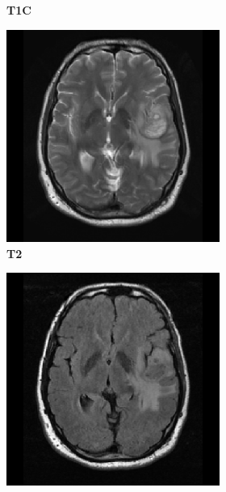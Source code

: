 \begin{subappendices}
\begin{figure}
\begin{subfigure}[b]{0.77\textwidth}
\begin{subfigure}[b]{0.24\textwidth}
        \caption*{\normalfont \textbf{\acrshort{T1C}}\nopunct}
        \end{subfigure}
        \hfill
        \begin{subfigure}[b]{0.24\textwidth}
        \includegraphics[width=\textwidth]{Figures/TCGA-06-0238_T2.png}
        \caption*{\normalfont \textbf{\acrshort{T2}}\nopunct}
        \end{subfigure}
        \hfill
        \begin{subfigure}[b]{0.24\textwidth}
        \includegraphics[width=\textwidth]{Figures/TCGA-06-0238_FLAIR.png}

\end{subfigure}
\end{subfigure}
\end{figure}
\end{subappendices}

